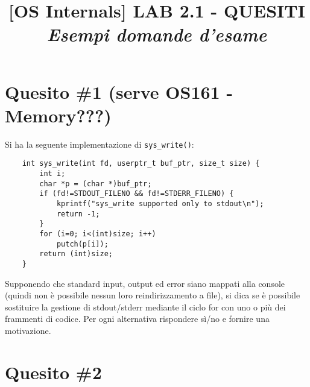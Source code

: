 \documentclass[12pt]{article}
\title{\vspace{-1cm}
\textbf{[OS Internals] LAB 2.1 - QUESITI}\\ 
\vspace{0.3cm}
\small{\textit{Esempi domande d'esame}}}
\author{}
\date{}
\begin{document}
\maketitle

\vspace{-2cm}
\section{Quesito \#1 {\small\color{red} (serve OS161 - Memory???)}}
{\color{blue}
Si ha la seguente implementazione di \texttt{sys\_write()}:
\begin{verbatim}
    int sys_write(int fd, userptr_t buf_ptr, size_t size) {
        int i;
        char *p = (char *)buf_ptr;
        if (fd!=STDOUT_FILENO && fd!=STDERR_FILENO) {
            kprintf("sys_write supported only to stdout\n");
            return -1;
        }
        for (i=0; i<(int)size; i++)
            putch(p[i]);
        return (int)size;
    }
\end{verbatim}

\noindent
Supponendo che standard input, output ed error siano mappati alla console (quindi non \`e
possibile nessun loro reindirizzamento a file), si dica se \`e possibile sostituire la gestione di
stdout/stderr mediante il ciclo for con uno o pi\`u dei frammenti di codice. Per ogni alternativa
rispondere s\`i/no e fornire una motivazione.

}

\section{Quesito \#2}
{
}
\end{document}
